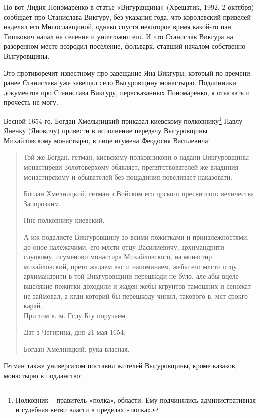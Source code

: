 Но вот Лидия Пономаренко в статье «Вигурівщина» (Хрещатик, 1992, 2 октября) сообщает про Станислава Викгуру, без указания года, что королевский привелей наделял его Милославщиной, однако спустя некоторое время какой-то пан Тишкович напал на селение и уничтожил его. И что Станислав Викгура на разоренном месте возродил поселение, фольварк, ставший началом собственно Выгуровщины.

Это противоречит известному про завещание Яна Викгуры, который по времени ранее Станислава уже завещал село Выгуровщину монастырю. Подлинники документов про Станислава Викгуру, пересказанных Пономаренко, я отыскать и прочесть не могу.

Весной 1654-го, Богдан Хмельницкий приказал киевскому полковнику\footnote{Полковник – правитель «полка», области. Ему подчинялись административная и судебная ветви власти в пределах «полка».} Павлу Яненку (Яновичу) привести в исполнение передачу Выгуровщины Михайловскому монастырю, в лице игумена Феодосия Василевича\cite[82]{mihdocs}:

\begin{quotation}
Той же Богдан, гетман, киевскому полковникови о надани Викгуровщины монастиреви Золотоверхому обявляет, препятствователей же владиния монастирскому и обывателей без пощадиния повеливает наказовати.

Богдан Хмелницкий, гетман з Войском его црского пресвитлого величества Запорозким.

Пне полковнику киевский.

А иж подалисте Викгуровщину зо всими пожитками и приналежностями, до оное належачими, его млсти отцу Василиевичу, архимандрити слуцкому, игуменови монастира Михайловского, на монастир михайловский, прето жадаем вас и напоминаем, жебы его млсти отцу архимандрити в той Викгуровщини перешкоди не було, але абы вцеле вшелякие пожитки доходили и жаден жебы кгрунтов тамошних и сеножат не займовал, а кгди которий бы перешкоду чинил, такового в. мст срокго карай.\\

При том в. м. Гсду Бгу поручаем.

Дат з Чегирина, дня 21 мая 1654.

Богдан Хмелницкий, рука власная.
\end{quotation}

Гетман также универсалом поставил жителей Выгуровщины, кроме казаков, монастырю в подданство\cite[81]{mihdocs}: 

